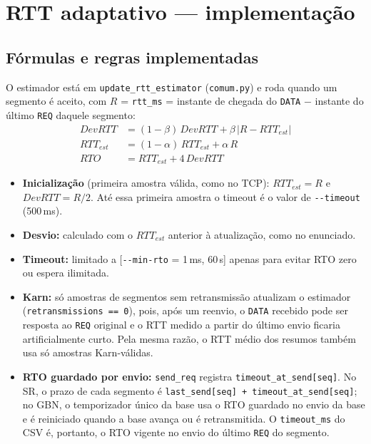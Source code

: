 \documentclass[11pt,a4paper]{article}
\newcommand{\cod}[1]{\textcolor{codverde}{\texttt{\small #1}}}
\begin{document}
\section{RTT adaptativo --- implementação}\label{sec:rtt}

\subsection{Fórmulas e regras implementadas}

O estimador está em \cod{update\_rtt\_estimator} (\cod{comum.py}) e roda quando um segmento é aceito,
com $R$ = \cod{rtt\_ms} = instante de chegada do \cod{DATA} $-$ instante do último \cod{REQ} daquele
segmento:
\begin{align*}
\mathit{DevRTT} &= (1-\beta)\,\mathit{DevRTT} + \beta\,\lvert R - \mathit{RTT}_{est}\rvert\\
\mathit{RTT}_{est} &= (1-\alpha)\,\mathit{RTT}_{est} + \alpha\,R\\
\mathit{RTO} &= \mathit{RTT}_{est} + 4\,\mathit{DevRTT}
\end{align*}
\begin{itemize}
  \item \textbf{Inicialização} (primeira amostra válida, como no TCP): $\mathit{RTT}_{est} = R$ e
        $\mathit{DevRTT} = R/2$. Até essa primeira amostra o timeout é o valor de \cod{-{}-timeout} (500\,ms).
  \item \textbf{Desvio:} calculado com o $\mathit{RTT}_{est}$ anterior à atualização, como no enunciado.
  \item \textbf{Timeout:} limitado a [\cod{-{}-min-rto} = 1\,ms, 60\,s] apenas para evitar RTO zero ou
        espera ilimitada.
  \item \textbf{Karn:} só amostras de segmentos sem retransmissão atualizam o estimador
        (\cod{retransmissions == 0}), pois, após um reenvio, o \cod{DATA} recebido pode ser resposta ao
        \cod{REQ} original e o RTT medido a partir do último envio ficaria artificialmente curto. Pela
        mesma razão, o RTT médio dos resumos também usa só amostras Karn-válidas.
  \item \textbf{RTO guardado por envio:} \cod{send\_req} registra \cod{timeout\_at\_send[seq]}. No SR,
        o prazo de cada segmento é \cod{last\_send[seq] + timeout\_at\_send[seq]}; no GBN, o
        temporizador único da base usa o RTO guardado no envio da base e é reiniciado quando a base
        avança ou é retransmitida. O \cod{timeout\_ms} do CSV é, portanto, o RTO vigente no envio do
        último \cod{REQ} do segmento.
\end{itemize}
\end{document}
